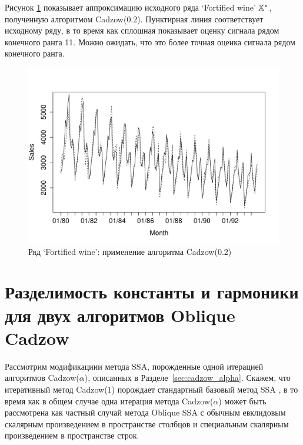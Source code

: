 \documentclass[12pt, specialist, subf,href,colorlinks=true,substylefile = spbu.rtx]{disser}
\theoremstyle{remark}
\theoremstyle{definition}
\begin{document}
Рисунок \ref{fig:rl} показывает аппроксимацию исходного ряда `Fortified wine' $\mathbb{X}^*$, полученную алгоритмом Cadzow($0.2$). 
Пунктирная линия соответствует исходному ряду, в то время как сплошная показывает оценку сигнала рядом конечного ранга 11.
Можно ожидать, что это более точная оценка сигнала рядом конечного ранга.

\begin{figure}[!hhh]
	\includegraphics[width = \columnwidth]{rlimage.pdf}
	\caption{Ряд `Fortified wine': применение алгоритма Cadzow($0.2$)}
	\label{fig:rl}
\end{figure}




\appendix 
\chapter{Разделимость константы и гармоники для двух алгоритмов Oblique Cadzow}
\label{sec:app}

Рассмотрим модификациии метода SSA, порожденные одной итерацией алгоритмов Cadzow($\alpha$), описанных в Разделе~\ref{sec:cadzow_alpha}. Скажем, что итеративный метод Cadzow($1$) порождает стандартный базовый метод SSA \cite{Golyandina.etal2001,Golyandina.Zhigljavsky2012}, в то время как в общем случае одна итерация метода Cadzow($\alpha$) может быть рассмотрена как частный случай метода Oblique SSA \cite{Golyandina2013} с обычным евклидовым скалярным произведением в пространстве столбцов и специальным скалярным произведением в пространстве строк.
\end{document}

